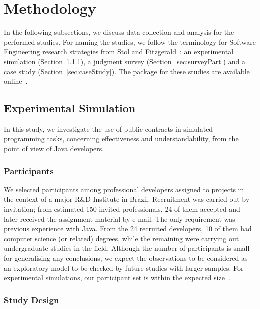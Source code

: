 \section{Methodology}
\label{sec:researchDesign}

In the following subsections, we discuss data collection and analysis for the performed studies. For naming the studies, we follow the terminology for Software Engineering research strategies from Stol and Fitzgerald~\cite{Stol2015}: an experimental simulation (Section~\ref{sec:expPart}), a judgment survey (Section~\ref{sec:surveyPart}) and a case study (Section~\ref{sec:caseStudy}). The package for these studies are available online~\cite{package-bib}.

\subsection{Experimental Simulation}
\label{sec:experiment}

In this study, we investigate the use of
public contracts in simulated programming tasks, concerning effectiveness and understandability, from the point of view of Java developers.

\subsubsection{Participants}
\label{sec:expPart}

We selected participants among professional developers assigned to projects in the context of a major R\&D Institute in Brazil. Recruitment was carried out by invitation; from estimated 150 invited professionals, 24 of them accepted and later received the assignment material by e-mail. The only requirement was previous experience with Java. From the 24 recruited developers, 10 of them had computer science (or related) degrees, while the remaining were carrying out undergraduate studies in the field. 
Although the number of participants is small for generalising any conclusions, we expect the observations to be considered as an exploratory model to be checked by future studies with larger samples. For experimental simulations, our participant set is within the expected size~\cite{Stol2015}.


\subsubsection{Study Design}
\label{sec:studyDesign}

